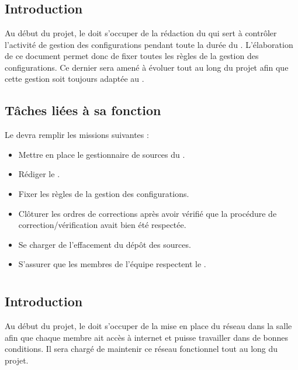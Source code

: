 \newpage
\section{\RGC}
\subsection*{Introduction}

Au début du projet, le \RGC{} doit s'occuper de la rédaction du \PGCCourt{} qui sert à contrôler l’activité de gestion des configurations pendant toute la durée du \PICCourt. L’élaboration de ce document permet donc de fixer toutes les règles de la gestion des configurations. Ce dernier sera amené à évoluer tout au long du projet afin que cette gestion soit toujours adaptée au \PICCourt.

\subsection*{Tâches liées à sa fonction}

Le \RGC{} devra remplir les missions suivantes :
\begin{itemize}
	\item Mettre en place le gestionnaire de sources du \PICCourt.
	\item Rédiger le \PGC.
	\item Fixer les règles de la gestion des configurations.
        \item Clôturer les ordres de corrections après avoir vérifié que la procédure de correction/vérification avait bien été respectée.
        \item Se charger de l'effacement du dépôt des sources.
        \item S'assurer que les membres de l'équipe \PICCourt{} respectent le \PGCCourt.
\end{itemize}

\newpage
\section{\RRS}
\subsection*{Introduction}

Au début du projet, le \RRS{} doit s'occuper de la mise en place du réseau dans la salle \PICCourt afin que chaque membre ait accès à internet et puisse travailler dans de bonnes conditions. Il sera chargé de maintenir ce réseau fonctionnel tout au long du projet.

